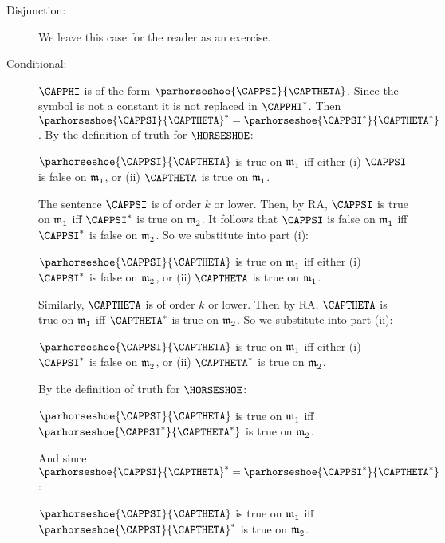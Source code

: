 \begin{PROOF}
\begin{description}
\begin{description}
\item[Disjunction:] We leave this case for the reader as an exercise.

\item[Conditional:] $\CAPPHI$ is of the form $\parhorseshoe{\CAPPSI}{\CAPTHETA}$.
Since the symbol \mention{$\HORSESHOE$} is not a constant it is not replaced in $\CAPPHI^*$.
Then $\parhorseshoe{\CAPPSI}{\CAPTHETA}^*=\parhorseshoe{\CAPPSI^*}{\CAPTHETA^*}$.
By the definition of truth for $\HORSESHOE$:

\begin{center}
$\parhorseshoe{\CAPPSI}{\CAPTHETA}$ is true on $\mathfrak{m^{\mathrm{}}_{\mathrm{1}}}$
  iff  either
   (i) $\CAPPSI$ is false on $\mathfrak{m^{\mathrm{}}_{\mathrm{1}}}$, or (ii)
   $\CAPTHETA$ is true on $\mathfrak{m^{\mathrm{}}_{\mathrm{1}}}$.
\end{center}

The sentence $\CAPPSI$ is of order $k$ or lower.
Then, by RA, $\CAPPSI$ is true on $\mathfrak{m^{\mathrm{}}_{\mathrm{1}}}$ iff $\CAPPSI^*$ is true on $\mathfrak{m^{\mathrm{}}_{\mathrm{2}}}$.
It follows that $\CAPPSI$ is false on $\mathfrak{m^{\mathrm{}}_{\mathrm{1}}}$ iff $\CAPPSI^*$ is false on $\mathfrak{m^{\mathrm{}}_{\mathrm{2}}}$.
So we substitute into part (i):

\begin{center}
$\parhorseshoe{\CAPPSI}{\CAPTHETA}$ is true on $\mathfrak{m^{\mathrm{}}_{\mathrm{1}}}$
  iff  either  
	  (i) $\CAPPSI^*$ is false on $\mathfrak{m^{\mathrm{}}_{\mathrm{2}}}$,
        or (ii) $\CAPTHETA$ is true on $\mathfrak{m^{\mathrm{}}_{\mathrm{1}}}$.
\end{center}

Similarly, $\CAPTHETA$ is of order $k$ or lower.
Then by RA, $\CAPTHETA$ is true on $\mathfrak{m^{\mathrm{}}_{\mathrm{1}}}$ iff $\CAPTHETA^*$ is true on $\mathfrak{m^{\mathrm{}}_{\mathrm{2}}}$.
So we substitute into part (ii):

\begin{center}
$\parhorseshoe{\CAPPSI}{\CAPTHETA}$ is true on $\mathfrak{m^{\mathrm{}}_{\mathrm{1}}}$
 iff either 
  (i) $\CAPPSI^*$ is false on $\mathfrak{m^{\mathrm{}}_{\mathrm{2}}}$,
 or (ii) $\CAPTHETA^*$ is true on $\mathfrak{m^{\mathrm{}}_{\mathrm{2}}}$.
\end{center}

By the definition of truth for $\HORSESHOE$:

\begin{center}
$\parhorseshoe{\CAPPSI}{\CAPTHETA}$ is true on $\mathfrak{m^{\mathrm{}}_{\mathrm{1}}}$
 iff $\parhorseshoe{\CAPPSI^*}{\CAPTHETA^*}$ is true on $\mathfrak{m^{\mathrm{}}_{\mathrm{2}}}$.
\end{center}

And since $\parhorseshoe{\CAPPSI}{\CAPTHETA}^*=\parhorseshoe{\CAPPSI^*}{\CAPTHETA^*}$:

\begin{center}
$\parhorseshoe{\CAPPSI}{\CAPTHETA}$ is true on $\mathfrak{m^{\mathrm{}}_{\mathrm{1}}}$ iff $\parhorseshoe{\CAPPSI}{\CAPTHETA}^*$ is true on $\mathfrak{m^{\mathrm{}}_{\mathrm{2}}}$.
\end{center}


\end{description}
\end{description}
\end{PROOF}
